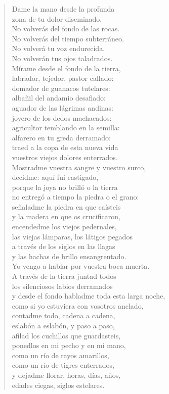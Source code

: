 \documentclass[12pt]{article}
\begin{document}
\begin{verse}
Dame la mano desde la profunda\\
zona de tu dolor diseminado.\\
No volverás del fondo de las rocas.\\
No volverás del tiempo subterráneo.\\
No volverá tu voz endurecida.\\
No volverán tus ojos taladrados.\\
Mírame desde el fondo de la tierra,\\
labrador, tejedor, pastor callado:\\
domador de guanacos tutelares:\\
albañil del andamio desafiado:\\
aguador de las lágrimas andinas:\\
joyero de los dedos machacados:\\
agricultor temblando en la semilla:\\
alfarero en tu greda derramado:\\
traed a la copa de esta nueva vida\\
vuestros viejos dolores enterrados.\\
Mostradme vuestra sangre y vuestro surco,\\
decidme: aquí fui castigado,\\
porque la joya no brilló o la tierra\\
no entregó a tiempo la piedra o el grano:\\
señaladme la piedra en que caísteis\\
y la madera en que os crucificaron,\\
encendedme los viejos pedernales,\\
las viejas lámparas, los látigos pegados\\
a través de los siglos en las llagas\\
y las hachas de brillo ensangrentado.\\
Yo vengo a hablar por vuestra boca muerta.\\
A través de la tierra juntad todos\\
los silenciosos labios derramados\\
y desde el fondo habladme toda esta larga noche,\\
como si yo estuviera con vosotros anclado,\\
contadme todo, cadena a cadena,\\
eslabón a eslabón, y paso a paso,\\
afilad los cuchillos que guardasteis,\\
ponedlos en mi pecho y en mi mano,\\
como un río de rayos amarillos,\\
como un río de tigres enterrados,\\
y dejadme llorar, horas, días, años,\\
edades ciegas, siglos estelares.  


\end{verse}
\end{document}
